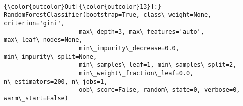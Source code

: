 \documentclass[11pt]{article}
\begin{document}
    \begin{center}
    \end{center}
    { \hspace*{\fill} \\}
    
\begin{Verbatim}[commandchars=\\\{\}]
{\color{outcolor}Out[{\color{outcolor}13}]:} RandomForestClassifier(bootstrap=True, class\_weight=None, criterion='gini',
                     max\_depth=3, max\_features='auto', max\_leaf\_nodes=None,
                     min\_impurity\_decrease=0.0, min\_impurity\_split=None,
                     min\_samples\_leaf=1, min\_samples\_split=2,
                     min\_weight\_fraction\_leaf=0.0, n\_estimators=200, n\_jobs=1,
                     oob\_score=False, random\_state=0, verbose=0, warm\_start=False)
\end{Verbatim}
            

    
    
    
    
\end{document}
